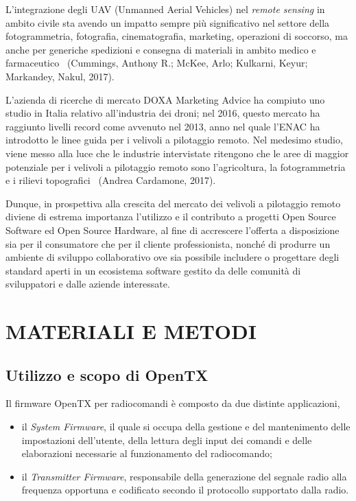 \documentclass[a4paper, 12pt]{report} %
\begin{document}
L'integrazione degli UAV (Unmanned Aerial Vehicles) nel \emph{remote sensing} in ambito civile sta avendo un impatto sempre più significativo nel settore della fotogrammetria, fotografia, cinematografia, marketing, operazioni di soccorso, ma anche per generiche spedizioni e consegna di materiali in ambito medico e farmaceutico~\cite{rise-uavs} (Cummings, Anthony R.; McKee, Arlo; Kulkarni, Keyur; Markandey, Nakul, 2017). 

L'azienda di ricerche di mercato DOXA Marketing Advice ha compiuto uno studio in Italia relativo all'industria dei droni; nel 2016, questo mercato ha raggiunto livelli record come avvenuto nel 2013, anno nel quale l'ENAC ha introdotto le linee guida per i velivoli a pilotaggio remoto. Nel medesimo studio, viene messo alla luce che le industrie intervistate ritengono che le aree di maggior potenziale per i velivoli a pilotaggio remoto sono l'agricoltura, la fotogrammetria e i rilievi topografici~\cite{italy-uavs} (Andrea Cardamone, 2017).

Dunque, in prospettiva alla crescita del mercato dei velivoli a pilotaggio remoto diviene di estrema importanza l'utilizzo e il contributo a progetti Open Source Software ed Open Source Hardware, al fine di accrescere l'offerta a disposizione sia per il consumatore che per il cliente professionista, nonché di produrre un ambiente di sviluppo collaborativo ove sia possibile includere o progettare degli standard aperti in un ecosistema software gestito da delle comunità di sviluppatori e dalle aziende interessate.


\clearpage

\chapter{MATERIALI E METODI}
\section{Utilizzo e scopo di OpenTX}

Il firmware OpenTX per radiocomandi è composto da due distinte applicazioni\cite{opentx-firmware},
\begin{itemize}
        \item il \emph{System Firmware}, il quale si occupa della gestione e del mantenimento delle impostazioni dell'utente, della lettura degli input dei comandi e delle elaborazioni necessarie al funzionamento del radiocomando;
        \item il \emph{Transmitter Firmware}, responsabile della generazione del segnale radio alla frequenza opportuna e codificato secondo il protocollo supportato dalla radio.
\end{itemize}
\end{document}
